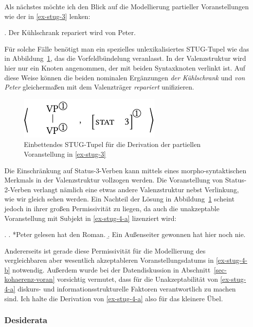 Als nächstes möchte ich den Blick auf die Modellierung partieller Voranstellungen wie der in \ref{ex-stug-3} lenken: 

\ex. \label{ex-stug-3}Der Kühlschrank repariert wird von Peter.

Für solche Fälle benötigt man ein spezielles unlexikalisiertes STUG-Tupel wie das in Abbildung~\ref{fig-stug-6}, das die Vorfeldbündelung veranlasst. In der Valenzstruktur wird hier nur ein Knoten angenommen, der mit beiden Syntaxknoten verlinkt ist. Auf diese Weise können die beiden nominalen Ergänzungen {\it der Kühlschrank} und {\it von Peter} gleicherma\ss en mit dem Valenzträger {\it repariert} unifizieren.
\begin{figure}[t]
\centering
\includegraphics{graphics/abb96.pdf}
\caption{\label{fig-stug-6}Einbettendes STUG-Tupel für die Derivation der partiellen Voranstellung in \ref{ex-stug-3}}
\end{figure}
Die Einschränkung auf Status-3-Verben kann mittels eines morpho-syntaktischen Merkmals in der Valenzstruktur vollzogen werden. Die Voranstellung von Status-2-Verben verlangt nämlich eine etwas andere Valenzstruktur nebst Verlinkung, wie wir gleich sehen werden. Ein Nachteil der Lösung in Abbildung~\ref{fig-stug-6} scheint jedoch in ihrer gro\ss en Permissivität zu liegen, da auch die unakzeptable Voranstellung mit Subjekt in \ref{ex-stug-4-a} lizenziert wird:   

\ex. \label{ex-stug-4}
\a. *Peter gelesen hat den Roman. \hfill \citep[Figure~6]{Gerdes:04}\label{ex-stug-4-a}
\b. Ein Au\ss enseiter gewonnen hat hier noch nie. \hfill \citep[10-d]{Haider:90}\label{ex-stug-4-b}

Andererseits ist gerade diese Permissivität für die Modellierung des vergleichbaren aber wesentlich akzeptableren Voranstellungsdatums in \ref{ex-stug-4-b} notwendig. Au\ss erdem wurde bei der Datendiskussion in Abschnitt~\ref{sec-kohaerenz-voran} vorsichtig vermutet, dass für die Unakzeptabilität von \ref{ex-stug-4-a} diskurs- und informationsstrukturelle Faktoren verantwortlich zu machen sind. Ich halte die Derivation von \ref{ex-stug-4-a} also für das kleinere Übel.

\subsubsection*{Desiderata}


